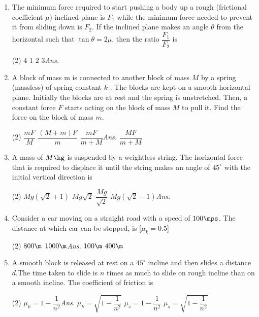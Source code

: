 \documentclass{article}
\newcommand{\ans}{\textcolor{red!95}{\textit{\quad Ans.}}}
\begin{document}
\begin{enumerate}
\item The minimum force required to start pushing a body up a rough (frictional coefficient $\mu$) inclined plane is $F_1$ while the minimum force needed to prevent it from sliding down is $F_2$. If the inclined plane makes an angle $\theta$ from the horizontal such
that $\tan\theta = 2\mu$, then the ratio $\dfrac{F_1}{F_2}$ is
\begin{tasks}(2)
	\task $4$
	\task $1$
	\task $2$
	\task $3$\ans
\end{tasks}

\item A block of mass m is connected to another
block of mass $M$ by a spring (massless) of spring constant $k$ . The blocks are kept on a smooth horizontal plane. Initially the blocks are at rest and the spring is unstretched. Then, a constant force $F$ starts acting on the block of mass $M$ to pull it. Find the force on the block of mass $m$.
\begin{tasks}(2)
	\task $\dfrac{mF}{M}$
	\task $\dfrac{(M+m)F}{m}$
	\task $\dfrac{mF}{m+M}$\ans
	\task $\dfrac{MF}{m+M}$
\end{tasks}

\item A mass of $M \kg$ is suspended by a weightless
string. The horizontal force that is required
to displace it until the string makes an angle
of $45^\circ$ with the initial vertical direction is
\begin{tasks}(2)
	\task $Mg(\sqrt{2} + 1)$
	\task $Mg\sqrt{2}$
	\task $\dfrac{Mg}{\sqrt{2}}$
	\task $Mg(\sqrt{2}-1)$\ans
\end{tasks}

\item Consider a car moving on a straight road with a speed of $100 \mps$. The distance at which car can be stopped, is [$\mu_k = 0.5$]
\begin{tasks}(2)
	\task $800\m$
	\task $1000\m$\ans 
	\task $100\m$
	\task $400\m$
\end{tasks}

\item A smooth block is released at rest on a $45^\circ$ incline and then slides a distance $d$.The time taken to slide is $n$ times as much to slide on rough incline than on a smooth incline. The coefficient of friction is
\begin{tasks}(2)
	\task $\mu_k=1-\dfrac{1}{n^2}$\ans
	\task $\mu_k=\sqrt{1-\dfrac{1}{n^2}}$
	\task $\mu_s=1-\dfrac{1}{n^2}$
	\task $\mu_s=\sqrt{1-\dfrac{1}{n^2}}$
\end{tasks}


\end{enumerate}
\end{document}
